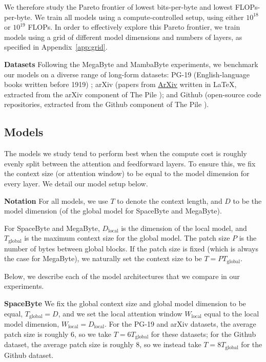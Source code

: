 We therefore study the Pareto frontier of lowest bits-per-byte and lowest FLOPs-per-byte. We train all models using a compute-controlled setup, using either $10^{18}$ or $10^{19}$ FLOPs. In order to effectively explore this Pareto frontier, we train models using a grid of different model dimensions and numbers of layers, as specified in Appendix~\ref{app:grid}.

\textbf{Datasets}
Following the MegaByte \cite{megabyte} and MambaByte \cite{mambabyte} experiments, we benchmark our models on a diverse range of long-form datasets: PG-19 (English-language books written before 1919) \cite{rae2020compressive}; arXiv (papers from \href{https://arxiv.org/}{ArXiv} written in LaTeX, extracted from the arXiv component of The Pile \cite{gao2020pile}); and Github (open-source code repositories, extracted from the Github component of The Pile \cite{gao2020pile}).

\subsection{Models}
\label{sec:models}

The models we study tend to perform best when the compute cost is roughly evenly split between the attention and feedforward layers. To ensure this, we fix the context size (or attention window) to be equal to the model dimension for every layer. We detail our model setup below.

\textbf{Notation}
For all models, we use $T$ to denote the context length, and $D$ to be the model dimension (of the global model for SpaceByte and MegaByte).

For SpaceByte and MegaByte,
  $D_\text{local}$ is the dimension of the local model, and $T_\text{global}$ is the maximum context size for the global model. The patch size $P$ is the number of bytes between global blocks. If the patch size is fixed (which is always the case for MegaByte), we naturally set the context size to be $T = P T_\text{global}$.

Below, we describe each of the model architectures that we compare in our experiments.

\textbf{SpaceByte}
We fix the global context size and global model dimension to be equal, $T_\text{global} = D$, and we set the local attention window $W_\text{local}$ equal to the local model dimension, $W_\text{local} = D_\text{local}$.
For the PG-19 and arXiv datasets, the average patch size is roughly 6, so we take $T = 6T_\text{global}$ for these datasets; for the Github dataset, the average patch size is roughly 8, so we instead take $T = 8T_\text{global}$ for the Github dataset.

